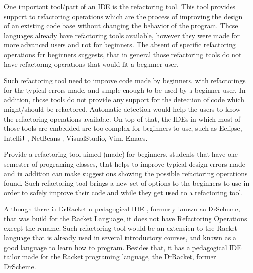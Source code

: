 One important tool/part of an IDE is the refactoring tool. This tool provides
support to refactoring operations which are the process of improving the design
of an existing code base \cite{fowler1999refactoring}
without changing the behavior of the program.
Those languages already have refactoring tools available, %
however they were made for more advanced users and not for beginners.
The absent of specific refactoring operations for beginners suggests, that in general %
those refactoring tools do not have refactoring operations that
would fit a beginner user.

Such refactoring tool need to improve code made by beginners, with refactorings for %
the typical errors made, and simple enough to be used by a beginner user.
In addition, those tools do not provide any support for the detection of code which might/should
be refactored.
Automatic detection would help the users to know the refactoring operations available.
On top of that, the IDEs in which most of those tools are embedded are too complex for beginners
to use, such as Eclipse\cite{carlson2005eclipse}, IntelliJ \cite{bock2011intellij}, NetBeans \cite{boudreau2002netbeans},
 VisualStudio, Vim, Emacs. %

Provide a refactoring tool aimed (made) for beginners, students that have one semester %
of programing classes, that helps to improve typical design errors made and in addition can
make suggestions showing the possible refactoring operations found.
Such refactoring tool brings a new set of options to the beginners to use
in order to safely improve their code and while they get used to a refactoring tool.




Although there is DrRacket a pedagogical IDE \cite{drscheme} \cite{drscheme_pegadogy},
formerly known as DrScheme, that was
build for the Racket Language, it does not have Refactoring Operations execpt the rename.
Such refactoring tool would be an extension to the Racket language that is already
used in several introductory courses,
and known as a good language to learn how to program.
Besides that, it has a pedagogical IDE tailor made for the Racket programing language,
the DrRacket, former DrScheme. %

